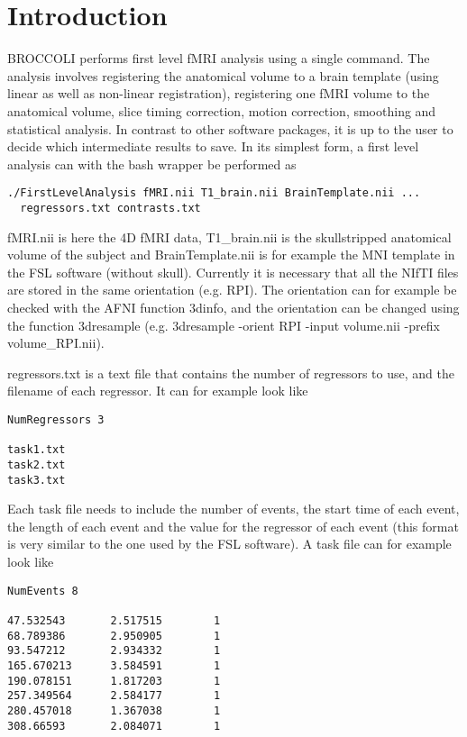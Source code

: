 \section{Introduction}

BROCCOLI performs first level fMRI analysis using a single command. The analysis involves registering the anatomical volume to a brain template (using linear as well as non-linear registration), registering one fMRI volume to the anatomical volume, slice timing correction, motion correction, smoothing and statistical analysis. In contrast to other software packages, it is up to the user to decide which intermediate results to save. In its simplest form, a first level analysis can with the bash wrapper be performed as

\begin{verbatim}
./FirstLevelAnalysis fMRI.nii T1_brain.nii BrainTemplate.nii ... 
  regressors.txt contrasts.txt 
\end{verbatim}

fMRI.nii is here the 4D fMRI data, T1\_brain.nii is the skullstripped anatomical volume of the subject and BrainTemplate.nii is for example the MNI template in the FSL software (without skull). Currently it is necessary that all the NIfTI files are stored in the same orientation (e.g. RPI). The orientation can for example be checked with the AFNI function 3dinfo, and the orientation can be changed using the function 3dresample (e.g. 3dresample -orient RPI -input volume.nii -prefix volume\_RPI.nii).

regressors.txt is a text file that contains the number of regressors to use, and the filename of each regressor. It can for example look like

\begin{verbatim}
NumRegressors 3

task1.txt
task2.txt
task3.txt
\end{verbatim}

Each task file needs to include the number of events, the start time of each event, the length of each event and the value for the regressor of each event (this format is very similar to the one used by the FSL software). A task file can for example look like

\begin{verbatim}
NumEvents 8

47.532543       2.517515        1
68.789386       2.950905        1
93.547212       2.934332        1
165.670213      3.584591        1
190.078151      1.817203        1
257.349564      2.584177        1
280.457018      1.367038        1
308.66593       2.084071        1
\end{verbatim}

